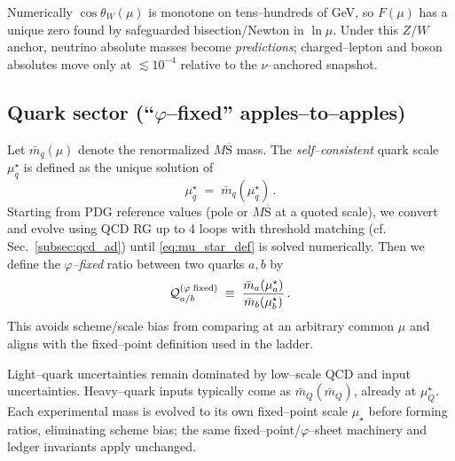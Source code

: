 \documentclass[%
  amsmath,amssymb,
  aps,
 prb,
 floatfix, showkeys
 ]{revtex4-2}
\begin{document}
 Numerically $\cos\theta_W(\mu)$ is monotone on tens–hundreds of GeV, so $F(\mu)$ has a unique zero found by safeguarded bisection/Newton in $\ln\mu$. Under this $Z/W$ anchor, neutrino absolute masses become \emph{predictions}; charged--lepton and boson absolutes move only at $\lesssim10^{-4}$ relative to the $\nu$--anchored snapshot.
 
 \subsection{Quark sector (``$\varphi$--fixed'' apples--to--apples)}
 Let $\bar m_q(\mu)$ denote the renormalized $M\overline{\mathrm{S}}$ mass.
 The \emph{self--consistent} quark scale $\mu^\star_q$ is defined as the unique solution of
 \begin{equation}
   \mu^\star_q \;=\; \bar m_q(\mu^\star_q)\,.
   \label{eq:mu_star_def}
 \end{equation}
 Starting from PDG reference values (pole or $M\overline{\mathrm{S}}$ at a quoted scale), we
 convert and evolve using QCD RG up to 4 loops with threshold matching (cf. Sec.~\ref{subsec:qcd_ad})
 until \eqref{eq:mu_star_def} is solved numerically.
 Then we define the \emph{$\varphi$--fixed} ratio between two quarks $a,b$ by
 \begin{equation}
   \mathcal{Q}_{a/b}^{(\varphi{\rm\;fixed})}
   \;\equiv\; \frac{\bar m_a(\mu^\star_a)}{\bar m_b(\mu^\star_b)}\,.
   \label{eq:phi_fixed_ratio}
 \end{equation}
 This avoids scheme/scale bias from comparing at an arbitrary common $\mu$ and
 aligns with the fixed--point definition used in the ladder.
 
  Light--quark uncertainties remain dominated by low--scale QCD and input uncertainties.
  Heavy--quark inputs typically come as $\bar m_Q(\bar m_Q)$, already at $\mu^\star_Q$.
 Each experimental mass is evolved to its own fixed--point scale $\mu_\star$ before forming ratios, eliminating scheme bias; the same fixed–point/$\varphi$–sheet machinery and ledger invariants apply unchanged.
 
\end{document}
